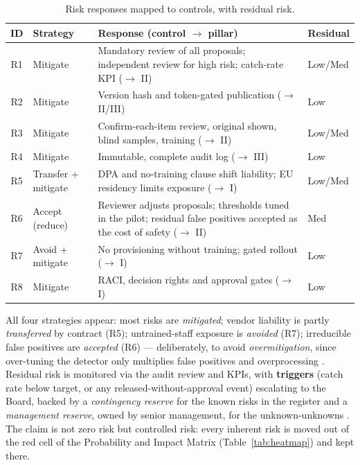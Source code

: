 \documentclass[12pt,a4paper]{article}
\begin{document}
\begin{table}[H]
\centering
\small
{}
\begin{tabular}{@{} c p{2.4cm} p{8.2cm} >{\centering\arraybackslash}p{1.9cm} @{}}
\toprule
\textbf{\color{accentdark}ID} & \textbf{\color{accentdark}Strategy} & \textbf{\color{accentdark}Response (control $\rightarrow$ pillar)} & \textbf{\color{accentdark}Residual} \\
\midrule
R1 & Mitigate & Mandatory review of all proposals; independent review for high risk; catch-rate KPI ($\rightarrow$ II) & Low/Med \\
R2 & Mitigate & Version hash and token-gated publication ($\rightarrow$ II/III) & Low \\
R3 & Mitigate & Confirm-each-item review, original shown, blind samples, training ($\rightarrow$ II) & Low/Med \\
R4 & Mitigate & Immutable, complete audit log ($\rightarrow$ III) & Low \\
R5 & Transfer + mitigate & DPA and no-training clause shift liability; EU residency limits exposure ($\rightarrow$ I) & Low/Med \\
R6 & Accept (reduce) & Reviewer adjusts proposals; thresholds tuned in the pilot; residual false positives accepted as the cost of safety ($\rightarrow$ II) & Med \\
R7 & Avoid + mitigate & No provisioning without training; gated rollout ($\rightarrow$ I) & Low \\
R8 & Mitigate & RACI, decision rights and approval gates ($\rightarrow$ I) & Low \\
\bottomrule
\end{tabular}
\caption{Risk responses mapped to controls, with residual risk.}
\label{tab:responses}
\end{table}

All four strategies appear: most risks are \emph{mitigated}; vendor liability is partly \emph{transferred} by contract (R5); untrained-staff exposure is \emph{avoided} (R7); irreducible false positives are \emph{accepted} (R6) --- deliberately, to avoid \emph{overmitigation}, since over-tuning the detector only multiplies false positives and overprocessing \cite{falchi_slides}. Residual risk is monitored via the audit review and KPIs, with \textbf{triggers} (catch rate below target, or any released-without-approval event) escalating to the Board, backed by a \emph{contingency reserve} for the known risks in the register and a \emph{management reserve}, owned by senior management, for the unknown-unknowns \cite{falchi_slides}. The claim is not zero risk but controlled risk: every inherent risk is moved out of the red cell of the Probability and Impact Matrix (Table~\ref{tab:heatmap}) and kept there.
\end{document}
